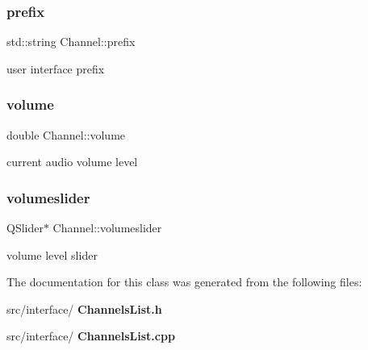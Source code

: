 \subsubsection{prefix}
{\footnotesize\ttfamily std\+::string Channel\+::prefix\hspace{0.3cm}{\ttfamily [private]}}

user interface prefix \mbox{\label{class_channel_aa8977e4605932b2201b03ebf3aa14ffd}} 
\subsubsection{volume}
{\footnotesize\ttfamily double Channel\+::volume}

current audio volume level \mbox{\label{class_channel_acbcbfb33558a69224daa176372eb8be3}} 
\subsubsection{volumeslider}
{\footnotesize\ttfamily Q\+Slider$\ast$ Channel\+::volumeslider}

volume level slider 

The documentation for this class was generated from the following files\+:\begin{DoxyCompactItemize}
\item 
src/interface/\textbf{ Channels\+List.\+h}\item 
src/interface/\textbf{ Channels\+List.\+cpp}\end{DoxyCompactItemize}

